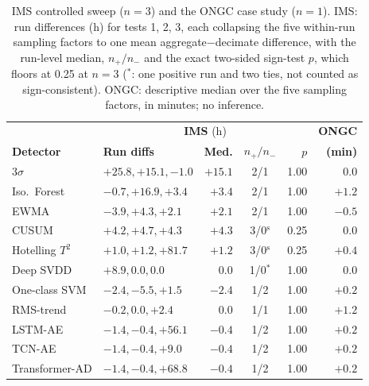 \begin{table}[t] \footnotesize
	\begin{center}
	\caption{IMS controlled sweep ($n=3$) and the ONGC case study ($n=1$). IMS: run differences (h) for tests 1, 2, 3, each collapsing the five within-run sampling factors to one mean aggregate$-$decimate difference, with the run-level median, $n_+/n_-$ and the exact two-sided sign-test $p$, which floors at 0.25 at $n=3$ ($^\ast$: one positive run and two ties, not counted as sign-consistent). ONGC: descriptive median over the five sampling factors, in minutes; no inference.}
	\label{tab:imsongc}
	\setlength{\tabcolsep}{2.5pt}
	\begin{tabular}{l l r c r r}
		\hline \hline
		 & \multicolumn{4}{c}{\textbf{IMS} (h)} & \textbf{ONGC} \\
		\textbf{Detector} & \textbf{Run diffs} & \textbf{Med.} & $n_+/n_-$ & $p$ & \textbf{(min)} \\
		\hline
		$3\sigma$ & $+25.8,+15.1,-1.0$ & $+15.1$ & 2/1 & 1.00 & 0.0 \\
		Iso.\ Forest & $-0.7,+16.9,+3.4$ & $+3.4$ & 2/1 & 1.00 & $+1.2$ \\
		EWMA & $-3.9,+4.3,+2.1$ & $+2.1$ & 2/1 & 1.00 & $-0.5$ \\
		CUSUM & $+4.2,+4.7,+4.3$ & $+4.3$ & 3/0$^{\mathrm{s}}$ & 0.25 & 0.0 \\
		Hotelling $T^2$ & $+1.0,+1.2,+81.7$ & $+1.2$ & 3/0$^{\mathrm{s}}$ & 0.25 & $+0.4$ \\
		Deep SVDD & $+8.9,0.0,0.0$ & 0.0 & 1/0$^\ast$ & 1.00 & 0.0 \\
		One-class SVM & $-2.4,-5.5,+1.5$ & $-2.4$ & 1/2 & 1.00 & $+0.2$ \\
		RMS-trend & $-0.2,0.0,+2.4$ & 0.0 & 1/1 & 1.00 & $+1.2$ \\
		LSTM-AE & $-1.4,-0.4,+56.1$ & $-0.4$ & 1/2 & 1.00 & $+0.2$ \\
		TCN-AE & $-1.4,-0.4,+9.0$ & $-0.4$ & 1/2 & 1.00 & $+0.2$ \\
		Transformer-AD & $-1.4,-0.4,+68.8$ & $-0.4$ & 1/2 & 1.00 & $+0.2$ \\
		\hline \hline
	\end{tabular}
	\end{center}
\end{table}
